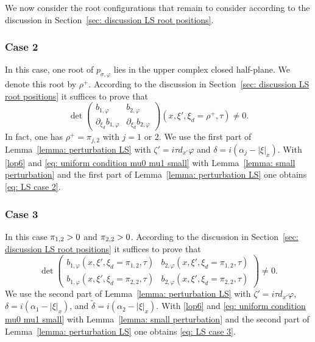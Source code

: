 \documentclass[10pt]{amsart}
\theoremstyle{plain}
\theoremstyle{definition}
\let \Im \relax
\DeclareMathOperator{\Im}{Im}
\newcommand{\pconj}{p_{\sigma,\varphi}}
\begin{document}
We now consider the root configurations that remain to consider
according to the discussion in Section~\ref{sec: discussion LS root
positions}.

\subsubsection*{Case 2}
In this case, one root of $\pconj$ lies in the upper complex closed
half-plane. We denote this root by $\rho^+$. According to the
discussion in Section~\ref{sec: discussion LS root positions} it
suffices to prove that
\begin{equation}
\label{eq: LS case 2}
\det
\begin{pmatrix}
b_{1,\varphi} &b_{2,\varphi}\\[
2pt]
\partial_{\xi_d}b_{1,\varphi}& \partial_{\xi_d}b_{2,\varphi}
\end{pmatrix}(x,\xi',\xi_d=\rho^+,\tau) \neq 0.
\end{equation}
In fact, one has $\rho^+ = \pi_{j,2}$ with $j=1$ or $2$. We use
the first part of Lemma~\ref{lemma: perturbation LS} with
$\zeta' = i \tau d_{x'} \varphi$ and
$\delta = i (\alpha_j - |\xi|_x)$. With \eqref{lop6} and \eqref{eq:
uniform condition mu0 mu1 small} with Lemma~\ref{lemma: small
perturbation} and the first part of Lemma~\ref{lemma: perturbation
LS} one obtains \eqref{eq: LS case 2}.

\subsubsection*{Case 3}
In this case $\Im \pi_{1,2}>0$ and $\Im \pi_{2,2} >0$. According to the
discussion in Section~\ref{sec: discussion LS root positions} it
suffices to prove that
\begin{equation}\label{eq: LS case 3}
\det
\begin{pmatrix}
b_{1,\varphi}(x,\xi',\xi_d=\pi_{1,2},\tau) & b_{2,\varphi}(x,\xi',\xi_d=\pi_{1,2},\tau) \\[
4pt]
b_{1,\varphi}(x,\xi',\xi_d=\pi_{2,2},\tau) & b_{2,\varphi}(x,\xi',\xi_d=\pi_{2,2},\tau)
\end{pmatrix}\neq 0.
\end{equation}
We use the second part of
Lemma~\ref{lemma: perturbation LS} with
$\zeta' = i \tau d_{x'} \varphi$,
$\delta = i (\alpha_1 - |\xi|_x)$, and $\tilde{\delta} = i (\alpha_2 - |\xi|_x)$. With \eqref{lop6} and \eqref{eq:
uniform condition mu0 mu1 small} with Lemma~\ref{lemma: small
perturbation} and the second part of Lemma~\ref{lemma: perturbation
LS} one obtains \eqref{eq: LS case 3}.
\end{document}

